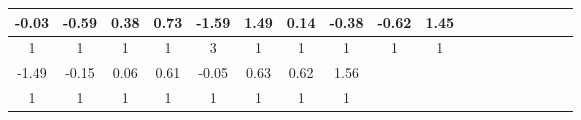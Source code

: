 \begin{tabular}{|c|c|c|c|c|c|c|c|c|c|c|c|c|c|c|c|c|c|}
    \hline
    -0.03 & -0.59 & 0.38 & 0.73 & -1.59 & 1.49 & 0.14 & -0.38 & -0.62 & 1.45\\
    \hline
    1 & 1 & 1 & 1 & 3 & 1 & 1 & 1 & 1 & 1\\
    \hline
    [1ex]
    \hline
    -1.49 & -0.15 & 0.06 & 0.61 & -0.05 & 0.63 & 0.62 & 1.56\\
    \hline
    1 & 1 & 1 & 1 & 1 & 1 & 1 & 1\\
    \hline
    [1ex]
\end{tabular}